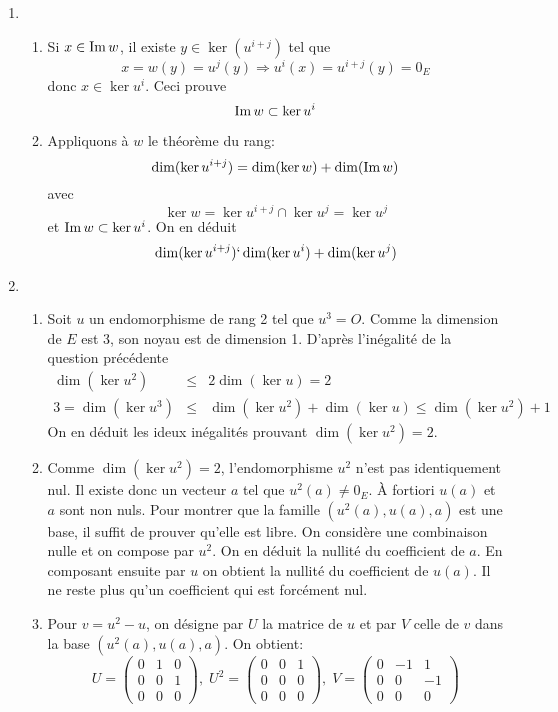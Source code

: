 \begin{enumerate}
\item \begin{enumerate}
 \item Si $x\in \operatorname{Im} w$, il existe $y\in \ker (u^{i+j})$ tel que 
\begin{displaymath}
x=w(y)=u^j(y) \Rightarrow  u^i(x)=u^{i+j}(y)=0_E
\end{displaymath}
donc $x\in \ker u^i$. Ceci prouve 
\[\operatorname{Im} w \subset \ker u^i\]
\item Appliquons à $w$ le théorème du rang:
\[\dim (\ker u^{i+j}) = \dim (\ker w) +\dim (\operatorname{Im} w)\]
avec 
\begin{displaymath}
\ker w =\ker u^{i+j}\cap \ker u^j = \ker u^j 
\end{displaymath}
et $\operatorname{Im} w \subset \ker u^i$. On en déduit
\[\dim (\ker u^{i+j}) \lq \dim (\ker u^i) +\dim (\ker u^j)\]
\end{enumerate}
\item \begin{enumerate}
 \item Soit $u$ un endomorphisme de rang 2 tel que $u^3=O$. Comme la dimension de $E$ est 3, son noyau est de dimension 1. D'après l'inégalité de la question précédente
\begin{eqnarray*}
 \dim (\ker u^2) &\leq& 2 \dim (\ker u)=2 \\
 3=\dim (\ker u^3) &\leq&  \dim (\ker u^2) + \dim (\ker u) \leq \dim (\ker u^2)+1
\end{eqnarray*}
On en déduit les ideux inégalités prouvant $\dim (\ker u^2)=2$.
\item Comme $\dim (\ker u^2)=2$, l'endomorphisme $u^2$ n'est pas identiquement nul. Il existe donc un vecteur $a$ tel que $u^2(a)\neq 0_E$. \`A fortiori $u(a)$ et $a$ sont non nuls.\newline
Pour montrer que la famille $(u^2(a),u(a),a)$ est une base, il suffit de prouver qu'elle est libre.\newline
On considère une combinaison nulle et on compose par $u^2$. On en déduit la nullité du coefficient de $a$. En composant ensuite par $u$ on obtient la nullité du coefficient de $u(a)$. Il ne reste plus qu'un coefficient qui est forcément nul.
\item Pour $v=u^2-u$, on désigne par $U$ la matrice de $u$ et par $V$ celle de $v$ dans la base $(u^2(a),u(a),a)$. On obtient:
\[
U= \begin{pmatrix}
    0 & 1 & 0 \\
0 & 0 & 1\\
0 & 0 & 0
   \end{pmatrix}
,\;
 U^2=\begin{pmatrix}
0 & 0 & 1 \\
0 & 0 & 0\\
0 & 0 & 0
   \end{pmatrix}
,\;
 V= \begin{pmatrix}
0 & -1 & 1 \\
0 & 0 & -1\\
0 & 0 & 0
   \end{pmatrix}
\]

\end{enumerate}

\end{enumerate}
